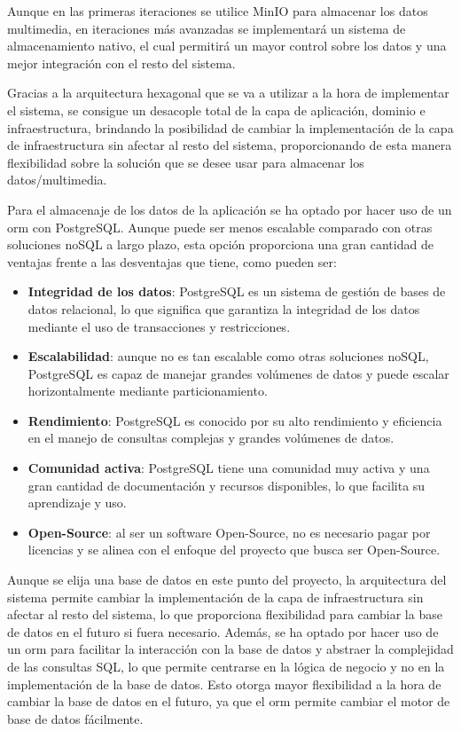 Aunque en las primeras iteraciones se utilice MinIO para almacenar los datos multimedia, en iteraciones más avanzadas se implementará un sistema de almacenamiento nativo, el cual permitirá un mayor control sobre los datos y una mejor integración con el resto del sistema.

Gracias a la arquitectura hexagonal que se va a utilizar a la hora de implementar el sistema, se consigue un desacople total de la capa de aplicación, dominio e infraestructura, brindando la posibilidad de cambiar la implementación de la capa de infraestructura sin afectar al resto del sistema, proporcionando de esta manera flexibilidad sobre la solución que se desee usar para almacenar los datos/multimedia.

Para el almacenaje de los datos de la aplicación se ha optado por hacer uso de un \acrshort{orm} con PostgreSQL.
Aunque puede ser menos escalable comparado con otras soluciones noSQL a largo plazo, esta opción proporciona una gran cantidad de ventajas frente a las desventajas que tiene, como pueden ser:
\begin{itemize}
    \item \textbf{Integridad de los datos}: PostgreSQL es un sistema de gestión de bases de datos relacional, lo que significa que garantiza la integridad de los datos mediante el uso de transacciones y restricciones.
    \item \textbf{Escalabilidad}: aunque no es tan escalable como otras soluciones noSQL, PostgreSQL es capaz de manejar grandes volúmenes de datos y puede escalar horizontalmente mediante particionamiento.
    \item \textbf{Rendimiento}: PostgreSQL es conocido por su alto rendimiento y eficiencia en el manejo de consultas complejas y grandes volúmenes de datos.
    \item \textbf{Comunidad activa}: PostgreSQL tiene una comunidad muy activa y una gran cantidad de documentación y recursos disponibles, lo que facilita su aprendizaje y uso.
    \item \textbf{Open-Source}: al ser un software Open-Source, no es necesario pagar por licencias y se alinea con el enfoque del proyecto que busca ser Open-Source.
\end{itemize}

Aunque se elija una base de datos en este punto del proyecto, la arquitectura del sistema permite cambiar la implementación de la capa de infraestructura sin afectar al resto del sistema, lo que proporciona flexibilidad para cambiar la base de datos en el futuro si fuera necesario.
Además, se ha optado por hacer uso de un \acrshort{orm} para facilitar la interacción con la base de datos y abstraer la complejidad de las consultas SQL, lo que permite centrarse en la lógica de negocio y no en la implementación de la base de datos.
Esto otorga mayor flexibilidad a la hora de cambiar la base de datos en el futuro, ya que el \acrshort{orm} permite cambiar el motor de base de datos fácilmente.

